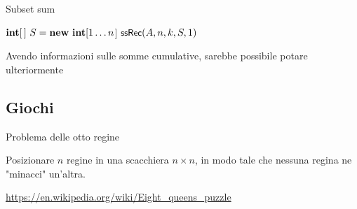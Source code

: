 \begin{frame}{Subset sum}

\vspace{-9pt}
\begin{Procedure}
\caption[A]{($\INTEGER[\,]\ A$, \INTEGER $n$, \INTEGER $k$)}
$\INTEGER[\,]\ S = \NEW\ \INTEGER[1 \ldots n$]\;
$\textsf{{\small ssRec}}(A, n,k, S, 1)$\;
\end{Procedure}

\begin{myboxtitle}[Note]
Avendo informazioni sulle somme cumulative, sarebbe possibile potare ulteriormente
\end{myboxtitle}

\end{frame}

\subsection{Giochi}

\begin{frame}{Problema delle otto regine}

\vspace{-9pt}
\begin{myboxtitle}[Problema]
Posizionare $n$ regine in una scacchiera $n \times n$, in modo tale che 
nessuna regina ne "minacci" un'altra. 
\end{myboxtitle}

\tiny
\url{https://en.wikipedia.org/wiki/Eight_queens_puzzle}
\end{frame}

